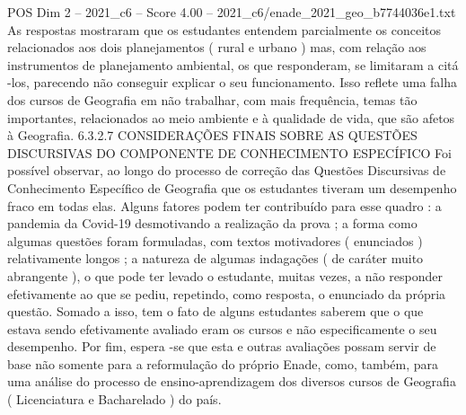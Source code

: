 \begin{textsample}{POS Dim 2 – 2021\_c6 – Score 4.00 – 2021\_c6/enade\_2021\_geo\_b7744036e1.txt}
As respostas mostraram que os estudantes entendem parcialmente os conceitos relacionados aos dois planejamentos ( rural e urbano ) mas, com relação aos instrumentos de planejamento ambiental, os que responderam, se limitaram a citá -los, parecendo não conseguir explicar o seu funcionamento.
Isso reflete uma falha dos cursos de Geografia em não trabalhar, com mais frequência, temas tão importantes, relacionados ao meio ambiente e à qualidade de vida, que são afetos à Geografia. 6.3.2.7 CONSIDERAÇÕES FINAIS SOBRE AS QUESTÕES DISCURSIVAS DO COMPONENTE DE CONHECIMENTO ESPECÍFICO Foi possível observar, ao longo do processo de correção das Questões Discursivas de Conhecimento Específico de Geografia que os estudantes tiveram um desempenho fraco em todas elas.
Alguns fatores podem ter contribuído para esse quadro : a pandemia da Covid-19 desmotivando a realização da prova ; a forma como algumas questões foram formuladas, com textos motivadores ( enunciados ) relativamente longos ; a natureza de algumas indagações ( de caráter muito abrangente ), o que pode ter levado o estudante, muitas vezes, a não responder efetivamente ao que se pediu, repetindo, como resposta, o enunciado da própria questão.
Somado a isso, tem o fato de alguns estudantes saberem que o que estava sendo efetivamente avaliado eram os cursos e não especificamente o seu desempenho.
Por fim, espera -se que esta e outras avaliações possam servir de base não somente para a reformulação do próprio Enade, como, também, para uma análise do processo de ensino-aprendizagem dos diversos cursos de Geografia ( Licenciatura e Bacharelado ) do país.

\end{textsample}
